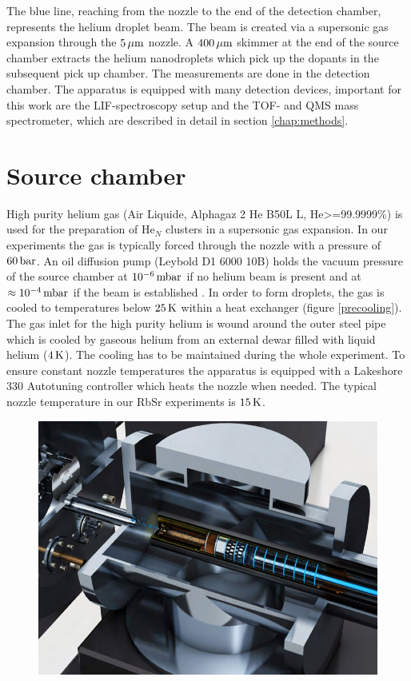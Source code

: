 \documentclass[parskip,12pt,headsepline,a4paper] {scrbook}
\begin{document}
The blue line, reaching from the nozzle to the end of the detection chamber, represents the helium droplet beam. The beam is created via a supersonic gas expansion through the $\unit[5]{\mu m}$ nozzle. A $\unit[400]{\mu m}$ skimmer at the end of the source chamber extracts the helium nanodroplets which pick up the dopants in the subsequent pick up chamber. The measurements are done in the detection chamber. The apparatus is equipped with many detection devices, important for this work are the LIF-spectroscopy setup and the TOF- and QMS mass spectrometer, which are described in detail in section \ref{chap:methods}.


\section{Source chamber}
\vspace{-1\baselineskip}
High purity helium gas (Air Liquide, Alphagaz 2 He B50L L, He>=99.9999\%) is used for the preparation of He$_N$ clusters in a supersonic gas expansion. In our experiments the gas is typically forced through the nozzle with a pressure of $\unit[60]{bar}$. An oil diffusion pump (Leybold D1 6000 10B) holds the vacuum pressure of the source chamber at $\unit[10^{-6}]{mbar}$ if no helium beam is present and at $\approx \unit[10^{-4}]{mbar}$ if the beam is established \cite{krois}. In order to form droplets, the gas is cooled to temperatures below $\unit[25]{K}$ within a heat exchanger (figure \ref{precooling}). The gas inlet for the high purity helium is wound around the outer steel pipe which is cooled by gaseous helium from an external dewar filled with liquid helium ($\unit[4]{K}$). The cooling has to be maintained during the whole experiment. To ensure constant nozzle temperatures the apparatus is equipped with a Lakeshore 330 Autotuning controller which heats the nozzle when needed. The typical nozzle temperature in our RbSr experiments is $\unit[15]{K}$.

\begin{figure}[ht]
\centerline{
\includegraphics[width=12cm]{./experimental_setup/pre_cooling.jpg}}
\end{figure}
\end{document}

